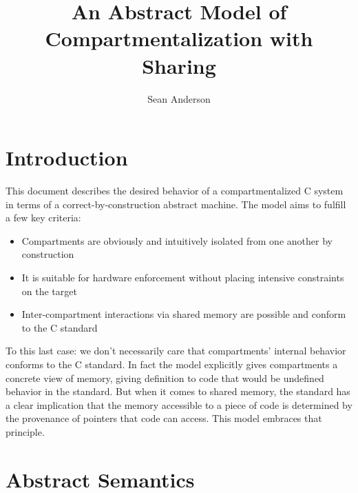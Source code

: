 \documentclass{article}
\title{An Abstract Model of Compartmentalization with Sharing}
\author{Sean Anderson}
\begin{document}
\maketitle




\section{Introduction}

This document describes the desired behavior of a compartmentalized C system in terms
of a correct-by-construction abstract machine. The model aims to fulfill a few key
criteria:

\begin{itemize}
\item Compartments are obviously and intuitively isolated from one another
  by construction
\item It is suitable for hardware enforcement without placing intensive constraints
  on the target
\item Inter-compartment interactions via shared memory are possible and conform
  to the C standard
\end{itemize}

To this last case: we don't necessarily care that compartments' internal behavior
conforms to the C standard. In fact the model explicitly gives compartments
a concrete view of memory, giving definition to code that would be undefined behavior
in the standard. But when it comes to shared memory, the standard has a clear
implication that the memory accessible to a piece of code is determined by
the provenance of pointers that code can access. This model embraces that principle.

\section{Abstract Semantics}
\end{document}
